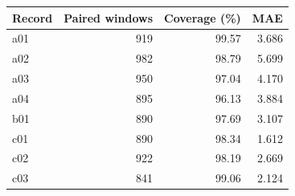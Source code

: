 \begin{tabular}{lrrr}\toprule Record & Paired windows & Coverage (\%) & MAE\\\midrule
a01 & 919 & 99.57 & 3.686\\
a02 & 982 & 98.79 & 5.699\\
a03 & 950 & 97.04 & 4.170\\
a04 & 895 & 96.13 & 3.884\\
b01 & 890 & 97.69 & 3.107\\
c01 & 890 & 98.34 & 1.612\\
c02 & 922 & 98.19 & 2.669\\
c03 & 841 & 99.06 & 2.124\\
\bottomrule\end{tabular}